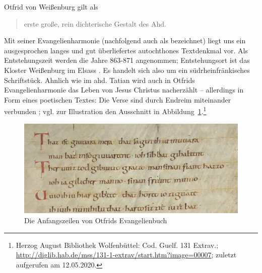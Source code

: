 Otfrid von Weißenburg gilt als \blockcquote[146]{Sonderegger2003}{erste große, rein dichterische Gestalt des Ahd.}. Mit seiner Evangelienharmonie (nachfolgend auch als  bezeichnet) liegt uns ein ausgesprochen langes und gut überliefertes autochthones Textdenkmal vor. Als Entstehungszeit werden die Jahre 863-871 angenommen; Entstehungsort ist das Kloster Weißenburg im Elsass \parencite[50]{Fleischer2011}. Es handelt sich also um ein südrheinfränkisches Schriftstück. Ahnlich wie im ahd. Tatian wird auch in Otfrids Evangelienharmonie das Leben von Jesus Christus nacherzählt -- allerdings in Form eines poetischen Textes: Die Verse sind durch Endreim miteinander verbunden   \parencite[zu Variationen im Versmaß s. ausführlich][148-150] {Sonderegger2003}; vgl. zur Illustration den Ausschnitt in Abbildung~\ref{abb:otfrid-hand}.\footnote{Herzog August Bibliothek Wolfenbüttel: Cod. Guelf. 131 Extrav.; \url{http://diglib.hab.de/mss/131-1-extrav/start.htm?image=00007}; zuletzt aufgerufen am 12.05.2020.}


\begin{figure}[h]
\begin{center}
  \includegraphics[width=10 cm]{images/otfrid-handschrift-ausschnitt.jpg}
  \caption {Die Anfangszeilen von Otfrids Evangelienbuch}
\label{abb:otfrid-hand}
\end{center}
\end{figure} 



